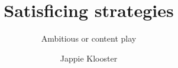 \documentclass[a4paper, twoside,%
11pt]{malrep}
\begin{document}

\title{Satisficing strategies}
\subtitle{Ambitious or content play}
\author{Jappie Klooster}

\maketitle

\begin{article}
  
\end{article}
\end{document}
